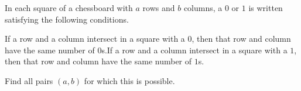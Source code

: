 In each square of a chessboard with $a$ rows and $b$ columns, a $0$ or $1$ is written satisfying the following conditions.

If a row and a column intersect in a square with a $0$,  then that row and column have the same number of $0$s.If a row and a column intersect in a square with a $1$,  then that row and column have the same number of $1$s.

Find all pairs $(a,b)$ for which this is possible.